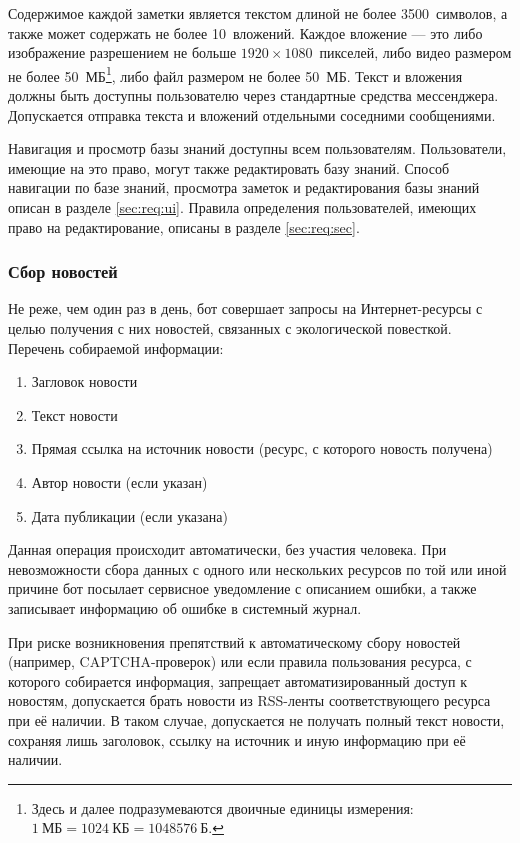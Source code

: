         Содержимое каждой заметки является текстом длиной не более 3500~символов, а также может содержать
        не более 10~вложений. Каждое вложение --- это либо изображение разрешением не больше
        \(1920 \times 1080\)~пикселей, либо видео размером не более 50~МБ\footnote{
            Здесь и далее подразумеваются двоичные единицы измерения: \(1~\text{МБ} = 1024~\text{КБ}
            = 1048576~\text{Б}\).
        }, либо файл размером не более 50~МБ. Текст и вложения должны быть доступны пользователю
        через стандартные средства мессенджера. Допускается отправка текста и вложений
        отдельными соседними сообщениями.

        Навигация и просмотр базы знаний доступны всем пользователям.
        Пользователи, имеющие на это право, могут также редактировать базу знаний.
        Способ навигации по базе знаний, просмотра заметок и редактирования базы знаний
        описан в разделе \ref{sec:req:ui}.
        Правила определения пользователей, имеющих право на редактирование, описаны в разделе
        \ref{sec:req:sec}.

    \subsubsection{Сбор новостей}
        \label{sec:req:fn:grabnews}
        Не реже, чем один раз в день, бот совершает запросы на Интернет-ресурсы с целью получения с них
        новостей, связанных с экологической повесткой. Перечень собираемой информации:
        \begin{enumerate}
            \item
                Загловок новости
            \item
                Текст новости
            \item
                Прямая ссылка на источник новости (ресурс, с которого новость получена)
            \item
                Автор новости (если указан)
            \item
                Дата публикации (если указана)
        \end{enumerate}

        Данная операция происходит автоматически, без участия человека. При невозможности сбора данных
        с одного или нескольких ресурсов по той или иной причине бот посылает сервисное уведомление
        с описанием ошибки, а также записывает информацию об ошибке в системный журнал.

        При риске возникновения препятствий к автоматическому сбору новостей (например, CAPTCHA-проверок)
        или если правила пользования ресурса, с которого собирается информация, запрещает автоматизированный
        доступ к новостям, допускается брать новости из RSS-ленты соответствующего ресурса при её наличии.
        В таком случае, допускается не получать полный текст новости, сохраняя лишь заголовок,
        ссылку на источник и иную информацию при её наличии.

